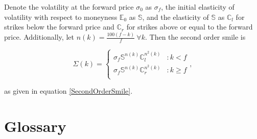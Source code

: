 \documentclass[12pt, a4paper, notitlepage]{article}
\numberwithin{equation}{subsection}
\numberwithin{figure}{subsection}
\numberwithin{table}{subsection}
\begin{document}
Denote the volatility at the forward price $\sigma_0$ as $\sigma_f$, the initial elasticity of volatility with respect to moneyness $\mathbb{E}_0$ as $\mathbb{S}$, and the elasticity of $\mathbb{S}$ as $\mathbb{C}_l$ for strikes below the forward price and $\mathbb{C}_r$ for strikes above or equal to the forward price.  Additionally, let $n(k) = \frac{100\left(f-k\right)}{f} \ \forall k$.  Then the second order smile is

\begin{equation*}
\Sigma(k) = \begin{cases}
			\sigma_f\mathbb{S}^{n(k)}\mathbb{C}_l^{n^{2}(k)} & : k < f	\\
            \sigma_f\mathbb{S}^{n(k)}\mathbb{C}_r^{n^{2}(k)} & : k \geq f	\\
        \end{cases},
\end{equation*}

as given in equation \ref{SecondOrderSmile}.

\newpage
\section{Glossary} \label{Glossary}
\end{document}
